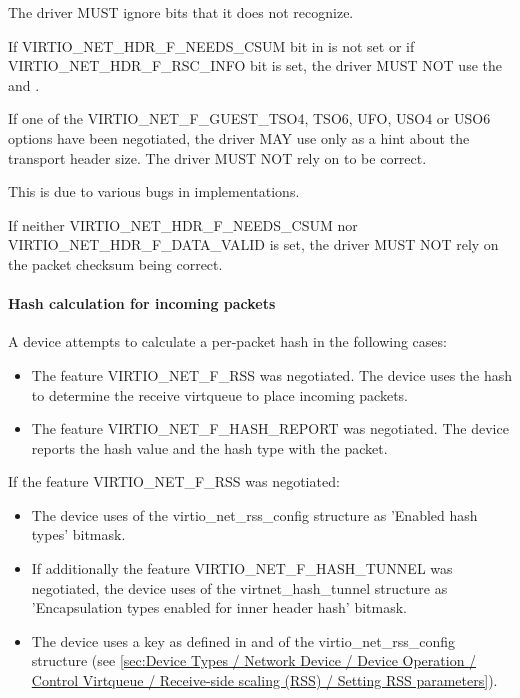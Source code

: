 
The driver MUST ignore  bits that it does not recognize.

If VIRTIO_NET_HDR_F_NEEDS_CSUM bit in  is not set or
if VIRTIO_NET_HDR_F_RSC_INFO bit  is set, the
driver MUST NOT use the  and .

If one of the VIRTIO_NET_F_GUEST_TSO4, TSO6, UFO, USO4 or USO6 options have
been negotiated, the driver MAY use  only as a hint about the
transport header size.
The driver MUST NOT rely on  to be correct.
\begin{note}
This is due to various bugs in implementations.
\end{note}

If neither VIRTIO_NET_HDR_F_NEEDS_CSUM nor
VIRTIO_NET_HDR_F_DATA_VALID is set, the driver MUST NOT
rely on the packet checksum being correct.

\paragraph{Hash calculation for incoming packets}
\label{sec:Device Types / Network Device / Device Operation / Processing of Incoming Packets / Hash calculation for incoming packets}

A device attempts to calculate a per-packet hash in the following cases:
\begin{itemize}
\item The feature VIRTIO_NET_F_RSS was negotiated. The device uses the hash to determine the receive virtqueue to place incoming packets.
\item The feature VIRTIO_NET_F_HASH_REPORT was negotiated. The device reports the hash value and the hash type with the packet.
\end{itemize}

If the feature VIRTIO_NET_F_RSS was negotiated:
\begin{itemize}
\item The device uses  of the virtio_net_rss_config structure as 'Enabled hash types' bitmask.
\item If additionally the feature VIRTIO_NET_F_HASH_TUNNEL was negotiated, the device uses  of the
      virtnet_hash_tunnel structure as 'Encapsulation types enabled for inner header hash' bitmask.
\item The device uses a key as defined in  and  of the virtio_net_rss_config structure (see
\ref{sec:Device Types / Network Device / Device Operation / Control Virtqueue / Receive-side scaling (RSS) / Setting RSS parameters}).
\end{itemize}

